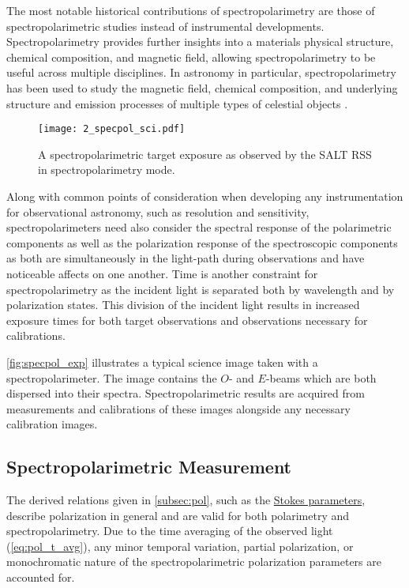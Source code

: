 The most notable historical contributions of spectropolarimetry are those of spectropolarimetric studies instead of instrumental developments. Spectropolarimetry provides further insights into a materials physical structure, chemical composition, and magnetic field, allowing spectropolarimetry to be useful across multiple disciplines. In astronomy in particular, spectropolarimetry has been used to study the magnetic field, chemical composition, and underlying structure and emission processes of multiple types of celestial objects \citep[see for example][]{specpol_AGN, specpol_stars, specpol_SN}.

\begin{figure}[t]
    \centering
    \texttt{[image: 2\_specpol\_sci.pdf]}
    \caption{A spectropolarimetric target exposure as observed by the \gls{SALT} \gls{RSS} in spectropolarimetry mode.}
    \label{fig:specpol_exp}
\end{figure}

Along with common points of consideration when developing any instrumentation for observational astronomy, such as resolution and sensitivity, spectropolarimeters need also consider the spectral response of the polarimetric components as well as the polarization response of the spectroscopic components as both are simultaneously in the light-path during observations and have noticeable affects on one another. Time is another constraint for spectropolarimetry as the incident light is separated both by wavelength and by polarization states. This division of the incident light results in increased exposure times for both target observations and observations necessary for calibrations.

\autoref{fig:specpol_exp} illustrates a typical science image taken with a spectropolarimeter. The image contains the $O$- and $E$-beams which are both dispersed into their spectra. Spectropolarimetric results are acquired from measurements and calibrations of these images alongside any necessary calibration images.

\subsection{Spectropolarimetric Measurement}

The derived relations given in \autoref{subsec:pol}, such as the \hyperref[eq:Stokes_params]{Stokes parameters}, describe polarization in general and are valid for both polarimetry and spectropolarimetry. Due to the time averaging of the observed light (\autoref{eq:pol_t_avg}), any minor temporal variation, partial polarization, or monochromatic nature of the spectropolarimetric polarization parameters are accounted for.

